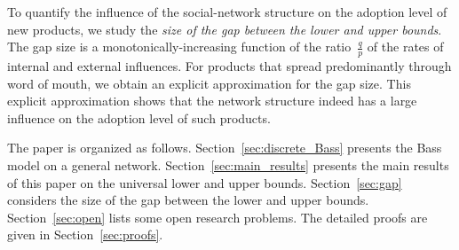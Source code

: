 \documentclass[review]{elsarticle}
\begin{document}
To quantify the influence of the social-network structure on the adoption level of new products, we study the {\em size of the gap between the lower and upper bounds}.
The gap size is a monotonically-increasing function of the 
ratio~$\frac{q}{p}$ of the rates of internal and external influences. 
For products that spread predominantly through word of mouth,
we obtain an explicit approximation for the gap size. This explicit approximation shows that the network structure indeed has a large influence on the adoption level of such products. 

   
The paper is organized as follows. Section~\ref{sec:discrete_Bass} presents the   Bass model on a general network. Section~\ref{sec:main_results} presents the main results of this paper on the universal  lower and upper bounds.
Section~\ref{sec:gap} considers the size of the gap between the lower and upper bounds.
Section~\ref{sec:open} lists some open research problems. 
 The detailed proofs are given in Section~\ref{sec:proofs}.





\end{document}
